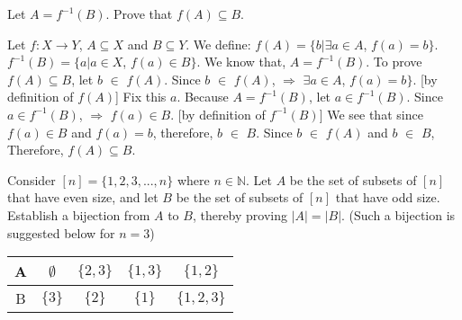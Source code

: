 \documentclass[addpoints]{exam}
\begin{document}
\begin{questions}
\begin{parts}
\end{parts}

\question[15] Let $A = f^{-1}(B)$. Prove that $f(A) \subseteq B$.
  \begin{solution}
  
    Let $f : X \rightarrow Y$, $A \subseteq X$ and $B \subseteq Y$. \newline
    We define: \newline
    $f(A) = \{b |\exists a \in A$, $f(a)=b\}$. \newline
    $f^{-1}(B) = \{a | a \in X$, $f(a) \in B\}$. \newline
    We know that, $A=f^{-1}(B)$. To prove $f(A) \subseteq B$, let $b$ $\in$ $f(A)$. \newline
    Since $b$ $\in$ $f(A)$, \newline
                $\Rightarrow$ $\exists a \in A$, $f(a)=b\}$. [by definition of $f(A)$] \newline
    Fix this $a$. Because $A=f^{-1}(B)$, let $a \in f^{-1}(B)$.\newline 
    Since $a \in f^{-1}(B)$,
                $\Rightarrow$ $f(a) \in B$. [by definition of $f^{-1}(B)$]\newline
    We see that since $f(a)\in B$ and $f(a)=b$, \newline
    therefore, $b$ $\in$ $B$. \newline
    Since $b$ $\in$ $f(A)$ and $b$ $\in$ $B$, 
    \newline            
    Therefore, $f(A) \subseteq B$.
    
        
\end{solution}

\question[15] Consider $[n] = \{1,2,3,...,n\}$ where $n \in \mathbb{N}$. Let $A$ be the set of subsets of $[n]$ that have even size, and let $B$ be the set of subsets of $[n]$ that have odd size. Establish a bijection from $A$ to $B$, thereby proving $|A| = |B|$. (Such a bijection is suggested below for $n = 3$) 

\begin{center}

  \begin{tabular}{ |c || c | c | c |c |}
    \hline
 A & $\emptyset$ & $\{2,3\}$ & $\{1,3\}$ & $\{1,2\}$ \\ \hline
 B & $\{3\}$ & $\{2\}$ & $\{1\}$ & $\{1,2,3\}$\\\hline
\end{tabular}
\end{center}


\end{questions}
\end{document}
